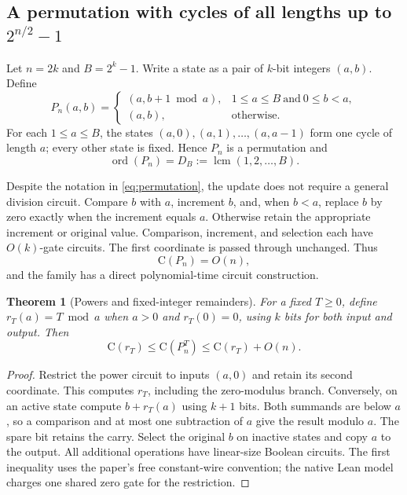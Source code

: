 \documentclass[11pt]{article}
\newtheorem{theorem}{Theorem}[section]
\theoremstyle{definition}
\theoremstyle{remark}
\newcommand{\CC}{\mathrm{C}}
\newcommand{\lcm}{\operatorname{lcm}}
\newcommand{\ord}{\operatorname{ord}}
\numberwithin{equation}{section}
\begin{document}
\subsection{A permutation with cycles of all lengths up to \texorpdfstring{$2^{n/2}-1$}{2 to the power n/2, minus 1}}

Let $n=2k$ and $B=2^k-1$.  Write a state as a pair of $k$-bit integers
$(a,b)$.  Define
\begin{equation}\label{eq:permutation}
 P_n(a,b)=
 \begin{cases}
   (a,b+1\bmod a),&1\leq a\leq B\ \text{and}\ 0\leq b<a,\\
   (a,b),&\text{otherwise}.
 \end{cases}
\end{equation}
For each $1\leq a\leq B$, the states
$(a,0),(a,1),\ldots,(a,a-1)$ form one cycle of length $a$; every other
state is fixed.  Hence $P_n$ is a permutation and
\begin{equation}\label{eq:order}
  \ord(P_n)=D_B:=\lcm(1,2,\ldots,B).
\end{equation}

Despite the notation in \cref{eq:permutation}, the update does not require
a general division circuit.  Compare $b$ with $a$, increment $b$, and,
when $b<a$, replace $b$ by zero exactly when the increment equals $a$.
Otherwise retain the appropriate increment or original value.
Comparison, increment, and selection each have $O(k)$-gate circuits.
The first coordinate is passed through unchanged.  Thus
\begin{equation}\label{eq:linear-update}
  \CC(P_n)=O(n),
\end{equation}
and the family has a direct polynomial-time circuit construction.

\begin{theorem}[Powers and fixed-integer remainders]\label{thm:remainders}
For a fixed $T\geq0$, define $r_T(a)=T\bmod a$ when $a>0$ and
$r_T(0)=0$, using $k$ bits for both input and output.  Then
\[
  \CC(r_T)\leq\CC(P_n^T)\leq\CC(r_T)+O(n).
\]
\end{theorem}

\begin{proof}
Restrict the power circuit to inputs $(a,0)$ and retain its second
coordinate.  This computes $r_T$, including the zero-modulus branch.
Conversely, on an active state compute $b+r_T(a)$ using $k+1$ bits.
Both summands are below $a$, so a comparison and at most one subtraction
of $a$ give the result modulo $a$.  The spare bit retains the carry.
Select the original $b$ on inactive states and copy $a$ to the output.
All additional operations have linear-size Boolean circuits.  The first
inequality uses the paper's free constant-wire convention; the native
Lean model charges one shared zero gate for the restriction.
\end{proof}
\end{document}
